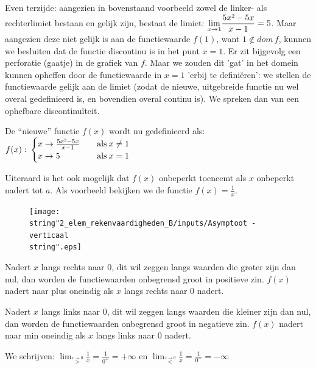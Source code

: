 Even terzijde: aangezien in bovenstaand voorbeeld zowel
de linker- als rechterlimiet bestaan en gelijk zijn, bestaat de limiet:
${\displaystyle \lim_{x\to1}}{\displaystyle \frac{5x\text{\texttwosuperior}-5x}{x-1}}=5$.
Maar aangezien deze niet gelijk is aan de functiewaarde $f(1)$, want
$1\notin dom\,f$, kunnen we besluiten dat de functie discontinu is
in het punt $x=1$. Er zit bijgevolg een perforatie (gaatje) in de
grafiek van $f$. Maar we zouden dit 'gat' in het domein kunnen opheffen
door de functiewaarde in $x=1$ 'erbij te defini\"eren': we stellen
de functiewaarde gelijk aan de limiet (zodat de nieuwe, uitgebreide
functie nu wel overal gedefinieerd is, en bovendien overal continu
is). We spreken dan van een ophefbare discontinu\"iteit.




De ``nieuwe'' functie $f(x)$ wordt nu gedefinieerd als:
$f(x):\:\begin{cases}
x\rightarrow\frac{5x\text{\texttwosuperior}-5x}{x-1} & \quad\mathrm{als}\:x\neq1\\
x\rightarrow5 & \quad\mathrm{als}\:x=1
\end{cases}$




Uiteraard is het ook mogelijk dat $f(x)$ onbeperkt toeneemt
als $x$ onbeperkt nadert tot $a$. Als voorbeeld bekijken we de functie
$f(x)=\frac{1}{x}$.

\begin{figure}[h]
\centering{}\texttt{[image: \\string"2\_elem\_rekenvaardigheden\_B/inputs/Asymptoot - verticaal\\string".eps]} 
\end{figure}

Nadert $x$ langs rechts naar $0$, dit wil zeggen langs
waarden die groter zijn dan nul, dan worden de functiewaarden onbegrensd
groot in positieve zin. $f(x)$ nadert naar plus oneindig als $x$
langs rechts naar $0$ nadert. 

Nadert $x$ langs links naar $0$, dit wil zeggen langs
waarden die kleiner zijn dan nul, dan worden de functiewaarden onbegrensd
groot in negatieve zin. $f(x)$ nadert naar min oneindig als $x$
langs links naar $0$ nadert.


We schrijven: ${\displaystyle \lim_{\overset{x\rightarrow0}{>}}}{\displaystyle \frac{1}{x}}={\displaystyle \frac{1}{0^{+}}}=+\infty$
en ${\displaystyle \lim_{\overset{x\rightarrow0}{<}}}{\displaystyle \frac{1}{x}}={\displaystyle \frac{1}{0^{-}}}=-\infty$




